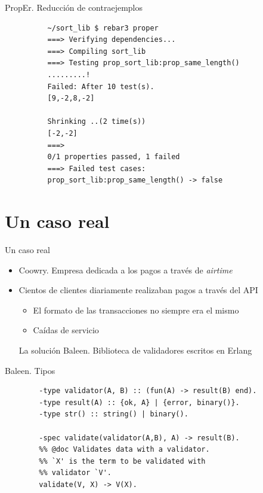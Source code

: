 \documentclass{beamer}
\begin{document}
      \begin{frame}[fragile]{PropEr. Reducción de contraejemplos}
        \begin{verbatim}
          ~/sort_lib $ rebar3 proper
          ===> Verifying dependencies...
          ===> Compiling sort_lib
          ===> Testing prop_sort_lib:prop_same_length()
          .........!
          Failed: After 10 test(s).
          [9,-2,8,-2]

          Shrinking ..(2 time(s))
          [-2,-2]
          ===>
          0/1 properties passed, 1 failed
          ===> Failed test cases:
          prop_sort_lib:prop_same_length() -> false
        \end{verbatim}
      \end{frame}

  \section{Un caso real}
    \begin{frame}{Un caso real}
      \begin{itemize}
        \item Coowry. Empresa dedicada a los pagos a través de \textit{airtime}
        \item Cientos de clientes diariamente realizaban pagos a través del API
        \begin{itemize}
          \item El formato de las transacciones no siempre era el mismo
          \item Caídas de servicio
        \end{itemize}
        \pause
        \begin{exampleblock}{La solución}
          Baleen. Biblioteca de validadores escritos en Erlang
        \end{exampleblock}
      \end{itemize}
    \end{frame}

    \begin{frame}[fragile]{Baleen. Tipos }
      \begin{verbatim}
        -type validator(A, B) :: (fun(A) -> result(B) end).
        -type result(A) :: {ok, A} | {error, binary()}.
        -type str() :: string() | binary().

        -spec validate(validator(A,B), A) -> result(B).
        %% @doc Validates data with a validator.
        %% `X' is the term to be validated with
        %% validator `V'.
        validate(V, X) -> V(X).
      \end{verbatim}
    \end{frame}
\end{document}
